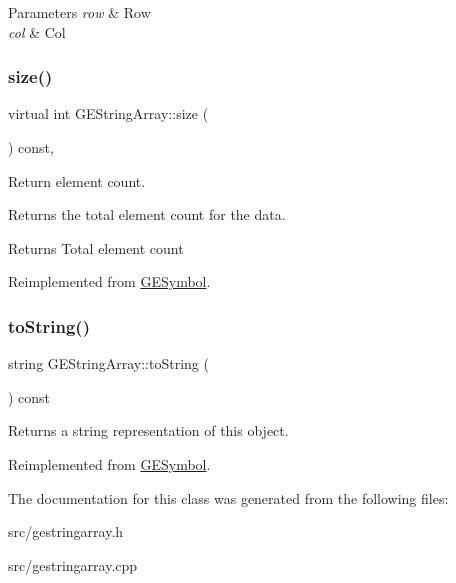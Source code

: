 \begin{DoxyParams}{Parameters}
{\em row} & Row \\
\hline
{\em col} & Col \\
\hline
\end{DoxyParams}
\mbox{\label{class_g_e_string_array_ac04d8fa75ee1b940dbe7855dc7d35c25}} 
\subsubsection{\texorpdfstring{size()}{size()}}
{\footnotesize\ttfamily virtual int G\+E\+String\+Array\+::size (\begin{DoxyParamCaption}{ }\end{DoxyParamCaption}) const\hspace{0.3cm}{\ttfamily [inline]}, {\ttfamily [virtual]}}



Return element count. 

Returns the total element count for the data.

\begin{DoxyReturn}{Returns}
Total element count 
\end{DoxyReturn}


Reimplemented from \hyperlink{class_g_e_symbol_a534b11b49a640420aaca9433db0c6479}{G\+E\+Symbol}.

\mbox{\label{class_g_e_string_array_abfb8d92b23e04bfedf6683138f533e62}} 
\subsubsection{\texorpdfstring{to\+String()}{toString()}}
{\footnotesize\ttfamily string G\+E\+String\+Array\+::to\+String (\begin{DoxyParamCaption}{ }\end{DoxyParamCaption}) const\hspace{0.3cm}{\ttfamily [virtual]}}



Returns a string representation of this object. 



Reimplemented from \hyperlink{class_g_e_symbol_a5c0d4c23b20574c28bddfe234409aa37}{G\+E\+Symbol}.



The documentation for this class was generated from the following files\+:\begin{DoxyCompactItemize}
\item 
src/gestringarray.\+h\item 
src/gestringarray.\+cpp\end{DoxyCompactItemize}
